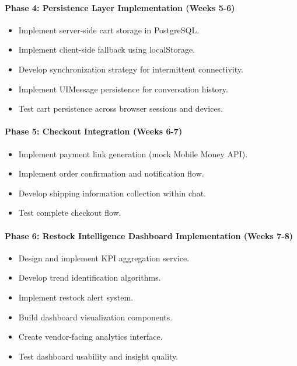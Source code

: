 \documentclass[12pt,a4paper]{article}
\begin{document}
\paragraph{Phase 4: Persistence Layer Implementation (Weeks 5-6)}

\begin{itemize}
    \item Implement server-side cart storage in PostgreSQL.
    \item Implement client-side fallback using localStorage.
    \item Develop synchronization strategy for intermittent connectivity.
    \item Implement UIMessage persistence for conversation history.
    \item Test cart persistence across browser sessions and devices.
\end{itemize}

\paragraph{Phase 5: Checkout Integration (Weeks 6-7)}

\begin{itemize}
    \item Implement payment link generation (mock Mobile Money API).
    \item Implement order confirmation and notification flow.
    \item Develop shipping information collection within chat.
    \item Test complete checkout flow.
\end{itemize}

\paragraph{Phase 6: Restock Intelligence Dashboard Implementation (Weeks 7-8)}

\begin{itemize}
    \item Design and implement KPI aggregation service.
    \item Develop trend identification algorithms.
    \item Implement restock alert system.
    \item Build dashboard visualization components.
    \item Create vendor-facing analytics interface.
    \item Test dashboard usability and insight quality.
\end{itemize}
\end{document}
